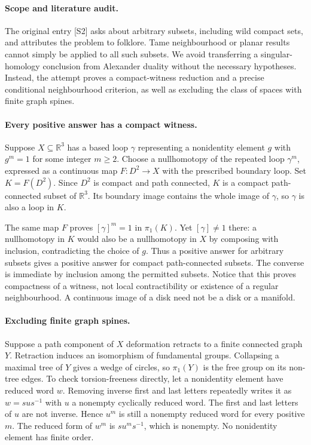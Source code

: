 \documentclass[11pt,a4paper]{article}
\begin{document}
\paragraph{Scope and literature audit.}
The original entry [S2] asks about arbitrary subsets, including wild compact sets, and attributes the problem to folklore. Tame neighbourhood or planar results cannot simply be applied to all such subsets. We avoid transferring a singular-homology conclusion from Alexander duality without the necessary hypotheses. Instead, the attempt proves a compact-witness reduction and a precise conditional neighbourhood criterion, as well as excluding the class of spaces with finite graph spines.

\paragraph{Every positive answer has a compact witness.}
Suppose $X\subseteq\mathbb R^3$ has a based loop $\gamma$ representing a nonidentity element $g$ with $g^m=1$ for some integer $m\ge2$. Choose a nullhomotopy of the repeated loop $\gamma^m$, expressed as a continuous map $F:D^2\to X$ with the prescribed boundary loop. Set $K=F(D^2)$. Since $D^2$ is compact and path connected, $K$ is a compact path-connected subset of $\mathbb R^3$. Its boundary image contains the whole image of $\gamma$, so $\gamma$ is also a loop in $K$.

The same map $F$ proves $[\gamma]^m=1$ in $\pi_1(K)$. Yet $[\gamma]\ne1$ there: a nullhomotopy in $K$ would also be a nullhomotopy in $X$ by composing with inclusion, contradicting the choice of $g$. Thus a positive answer for arbitrary subsets gives a positive answer for compact path-connected subsets. The converse is immediate by inclusion among the permitted subsets. Notice that this proves compactness of a witness, not local contractibility or existence of a regular neighbourhood. A continuous image of a disk need not be a disk or a manifold.

\paragraph{Excluding finite graph spines.}
Suppose a path component of $X$ deformation retracts to a finite connected graph $Y$. Retraction induces an isomorphism of fundamental groups. Collapsing a maximal tree of $Y$ gives a wedge of circles, so $\pi_1(Y)$ is the free group on its non-tree edges. To check torsion-freeness directly, let a nonidentity element have reduced word $w$. Removing inverse first and last letters repeatedly writes it as $w=sus^{-1}$ with $u$ a nonempty cyclically reduced word. The first and last letters of $u$ are not inverse. Hence $u^m$ is still a nonempty reduced word for every positive $m$. The reduced form of $w^m$ is $su^ms^{-1}$, which is nonempty. No nonidentity element has finite order.
\end{document}

